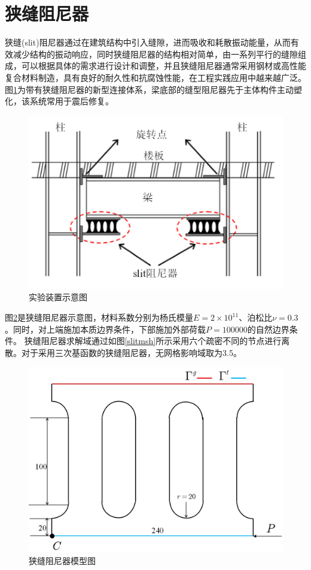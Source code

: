 \section{狭缝阻尼器}
狭缝(slit)阻尼器通过在建筑结构中引入缝隙，进而吸收和耗散振动能量，从而有效减少结构的振动响应，同时狭缝阻尼器的结构相对简单，由一系列平行的缝隙组成，可以根据具体的需求进行设计和调整，并且狭缝阻尼器通常采用钢材或高性能复合材料制造，具有良好的耐久性和抗腐蚀性能，在工程实践应用中越来越广泛。
图\ref{slit1}为带有狭缝阻尼器的新型连接体系，梁底部的缝型阻尼器先于主体构件主动塑化，该系统常用于震后修复。
\begin{figure}[H]
    \centering
    \includegraphics[scale=0.7]{figure/DAMPER/SLIT/1.png}
    \caption{实验装置示意图\cite{oh2009}}\label{slit1}
\end{figure}
图\ref{slit2}是狭缝阻尼器示意图，材料系数分别为杨氏模量$E=2\times 10^{11}$、泊松比$\nu=0.3$。同时，对上端施加本质边界条件，下部施加外部荷载$P=100000$的自然边界条件。
狭缝阻尼器求解域通过如图\ref{slitmsh}所示采用六个疏密不同的节点进行离散。对于采用三次基函数的狭缝阻尼器，无网格影响域取为3.5。
\begin{figure}[H]
    \centering
    \includegraphics[scale=0.5]{figure/DAMPER/SLIT/2.png}
    \caption{狭缝阻尼器模型图}\label{slit2}
\end{figure}
